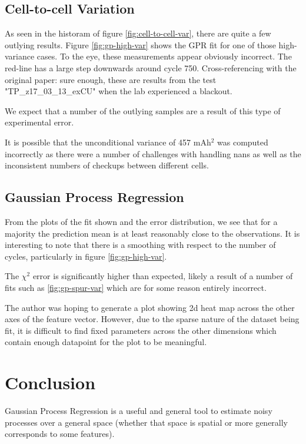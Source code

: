 \documentclass[conference]{IEEEtran}
\begin{document}
\subsection{Cell-to-cell Variation}

As seen in the historam of figure \ref{fig:cell-to-cell-var},
there are quite a few outlying results. Figure \ref{fig:gp-high-var}
shows the GPR fit for one of those high-variance cases.
To the eye, these measurements appear obviously incorrect. The red-line
has a large step downwards around cycle 750. Cross-referencing with
the original paper: sure enough, these are results from the
test "TP\_z17\_03\_13\_exCU" when the lab experienced a blackout.

We expect that a number of the outlying samples are a result
of this type of experimental error.

It is possible that the unconditional variance of 457 mAh$^2$
was computed incorrectly as there were a number of challenges
with handling nans as well as the inconsistent numbers of checkups
between different cells.


\subsection{Gaussian Process Regression}

From the plots of the fit shown and the error distribution, we see
that for a majority the prediction mean is at least reasonably
close to the observations. It is interesting to note that there
is a smoothing with respect to the number of cycles, particularly
in figure \ref{fig:gp-high-var}.

The $\chi^2$ error is significantly higher than expected, likely
a result of a number of fits such as \ref{fig:gp-spur-var}
which are for some reason entirely incorrect.

The author was hoping to generate a plot showing 2d heat map
across the other axes of the feature vector. However, due
to the sparse nature of the dataset being fit, it is difficult
to find fixed parameters across the other dimensions which
contain enough datapoint for the plot to be meaningful.


\section{Conclusion}

Gaussian Process Regression is a useful and general tool to
estimate noisy processes over a general space
(whether that space is spatial or more generally corresponds to some
features).
\end{document}
